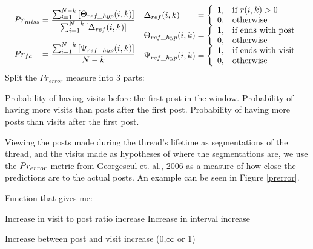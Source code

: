 \begin{align*}
	\begin{array}{l@{\mskip\thickmuskip}l}
	Pr_{miss} &=  \dfrac{%
		\sum^{N-k}_{i=1} \left[\Theta_{ref\_hyp} (i,k)\right]%
	}{%
		\sum^{N-k}_{i=1} \left[\Delta_{ref} (i,k)\right]%
	}\\
	 & \\
	Pr_{fa} &= \dfrac{%
		\sum^{N-k}_{i=1} \left[\Psi_{ref\_hyp} (i,k)\right]%
	}{N-k}
	\end{array}
	\begin{array}{l@{\mskip\thickmuskip}l}
		\Delta_{ref}(i,k) &= \left\{ \begin{array}{l l}
				1, & \text{if }r(i,k) > 0 \\
				0, & \text{otherwise} 
		\end{array} \right.\\
		\Theta_{ref\_hyp}(i,k) &= \left\{ \begin{array}{l l}
				1, & \text{if ends with post} \\
				0, & \text{otherwise} 
		\end{array} \right.\\
		\Psi_{ref\_hyp}(i,k) &= \left\{ \begin{array}{l l}
				1, & \text{if ends with visit}\\
				0, & \text{otherwise} 
		\end{array} \right.\\
	\end{array}
\end{align*}
Split the $Pr_{error}$ measure into 3 parts:

Probability of having visits before the first post in the window.
Probability of having more visits than posts after the first post.
Probability of having more posts than visits after the first post.



Viewing the posts made during the thread's lifetime as segmentations of the thread, and the visits made as hypotheses of where the segmentations are, we use the $Pr_{error}$ metric from Georgescul et. al., 2006 as a measure of how close the predictions are to the actual posts. An example can be seen in Figure \ref{prerror}.



Function that gives me:

Increase in visit to post ratio		increase
Increase in interval				increase

Increase between post and visit		increase
(0,$\infty$ or 1)

